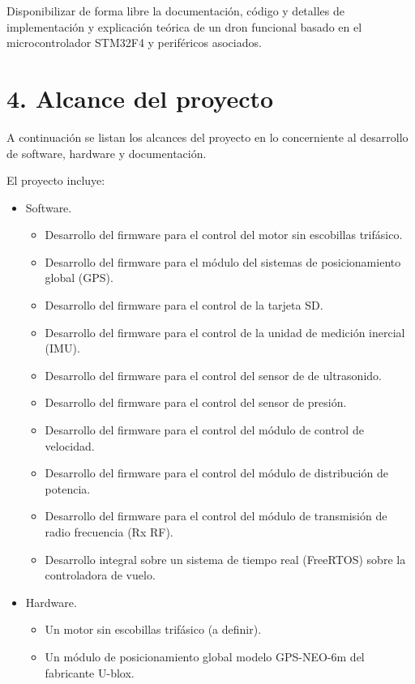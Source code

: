 \documentclass[
11pt, %
]{charter}
\begin{document}
	Disponibilizar de forma libre la documentaci\'on, c\'odigo y detalles de implementaci\'on y explicaci\'on te\'orica de un dron funcional basado en el microcontrolador STM32F4 y perif\'ericos asociados. 


\section{4. Alcance del proyecto}
\label{sec:alcance}



	A continuaci\'on se listan los alcances del proyecto en lo concerniente al desarrollo de software, hardware y documentaci\'on. 

	El proyecto incluye:
	\begin{itemize}
		\item Software.
		 	\begin{itemize}
			      \item Desarrollo del firmware para el control del motor sin escobillas trif\'asico.
			      \item Desarrollo del firmware para el m\'odulo del sistemas de posicionamiento global (GPS).
			      \item Desarrollo del firmware para el control de la tarjeta SD.
			      \item Desarrollo del firmware para el control de la unidad de medici\'on inercial (IMU). 
			      \item Desarrollo del firmware para el control del sensor de de ultrasonido.
			      \item Desarrollo del firmware para el control del sensor de presi\'on. 
			      \item Desarrollo del firmware para el control del m\'odulo de control de velocidad.
			      \item Desarrollo del firmware para el control del m\'odulo de distribuci\'on de potencia.
			      \item Desarrollo del firmware para el control del m\'odulo de transmisi\'on de radio frecuencia (Rx RF).
			      \item Desarrollo integral sobre un sistema de tiempo real (FreeRTOS) sobre la controladora de vuelo. 
		      \end{itemize}
		\item Hardware.
		      \begin{itemize}
			      \item Un motor sin escobillas trif\'asico (a definir).
			      \item Un m\'odulo de posicionamiento global modelo GPS-NEO-6m del fabricante U-blox.

\end{itemize}
\end{itemize}
\end{document}
